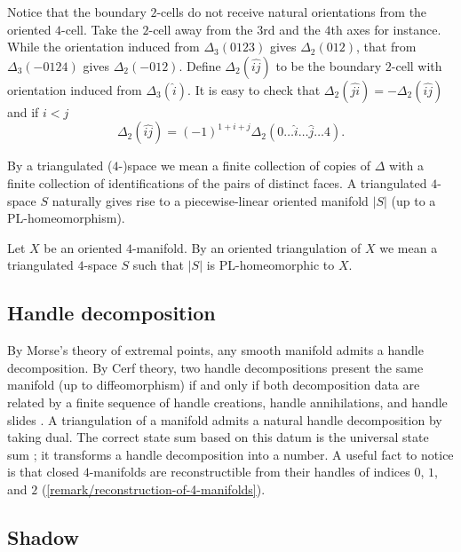 Notice that the boundary $2$-cells do not receive natural
orientations from the oriented $4$-cell. Take the $2$-cell away
from the $3$rd and the $4$th axes for instance. While the
orientation induced from $\Delta_{3}(0123)$ gives
$\Delta_{2}(012)$, that from $\Delta_{3}(-0124)$ gives
$\Delta_{2}(-012)$. Define $\Delta_{2}(\widehat{ij})$ to be the
boundary $2$-cell with orientation induced from
$\Delta_{3}(\widehat{i})$. It is easy to check that
$\Delta_{2}(\widehat{ji}) = -\Delta_{2}(\widehat{ij})$ and if $i<j$
$$\Delta_{2}(\widehat{ij}) = (-1)^{1+i+j}\Delta_{2}(0 \ldots \widehat{i} \ldots \widehat{j} \ldots 4).$$

By a triangulated ($4$-)space we mean a finite collection of
copies of $\Delta$ with a finite collection of identifications of
the pairs of distinct faces. A triangulated $4$-space $S$
naturally gives rise to a piecewise-linear oriented manifold
$|S|$ (up to a PL-homeomorphism).

\begin{definition}\label{def/triangulation-of-an-oriented-4-manifold}
  Let $X$ be an oriented $4$-manifold. By an oriented
  triangulation of $X$ we mean a triangulated $4$-space $S$ such
  that $|S|$ is PL-homeomorphic to $X$.
\end{definition}

\subsection{Handle decomposition}

\noindent By Morse's theory of extremal points, any smooth
manifold admits a handle decomposition. By Cerf theory, two
handle decompositions present the same manifold (up to
diffeomorphism) if and only if both decomposition data are
related by a finite sequence of handle creations, handle
annihilations, and handle slides
\cite{gompf-stipsicz/4-manifolds-and-kirby-calculus}. A
triangulation of a manifold admits a natural handle decomposition
by taking dual. The correct state sum based on this datum is the
universal state sum \cite{walker/universal-state-sum}; it
transforms a handle decomposition into a number. A useful fact to
notice is that closed $4$-manifolds are reconstructible from
their handles of indices $0$, $1$, and $2$
(\ref{remark/reconstruction-of-4-manifolds}).

\subsection{Shadow}

